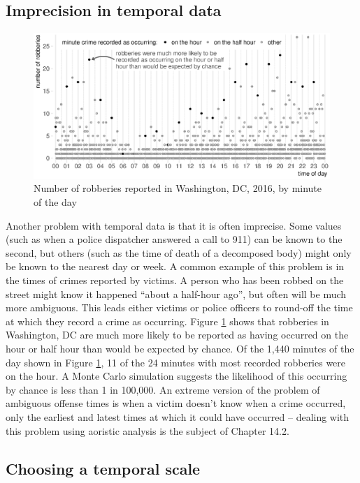 \documentclass[
  english,
  man,a4paper,mask,floatsintext]{apa6}
\begin{document}
\hypertarget{imprecision-in-temporal-data}{%
\subsection{Imprecision in temporal data}\label{imprecision-in-temporal-data}}

\begin{figure}
\centering
\includegraphics{figure_14-2.eps}
\caption{\label{fig:minutes}Number of robberies reported in Washington, DC, 2016, by minute of the day}
\end{figure}

Another problem with temporal data is that it is often imprecise. Some values (such as when a police dispatcher answered a call to 911) can be known to the second, but others (such as the time of death of a decomposed body) might only be known to the nearest day or week. A common example of this problem is in the times of crimes reported by victims. A person who has been robbed on the street might know it happened \enquote{about a half-hour ago}, but often will be much more ambiguous. This leads either victims or police officers to round-off the time at which they record a crime as occurring. Figure \ref{fig:minutes} shows that robberies in Washington, DC are much more likely to be reported as having occurred on the hour or half hour than would be expected by chance. Of the 1,440 minutes of the day shown in Figure \ref{fig:minutes}, 11 of the 24 minutes with most recorded robberies were on the hour. A Monte Carlo simulation suggests the likelihood of this occurring by chance is less than 1 in 100,000. An extreme version of the problem of ambiguous offense times is when a victim doesn't know when a crime occurred, only the earliest and latest times at which it could have occurred -- dealing with this problem using aoristic analysis is the subject of Chapter 14.2.

\hypertarget{choosing-a-temporal-scale}{%
\subsection{Choosing a temporal scale}\label{choosing-a-temporal-scale}}
\end{document}

